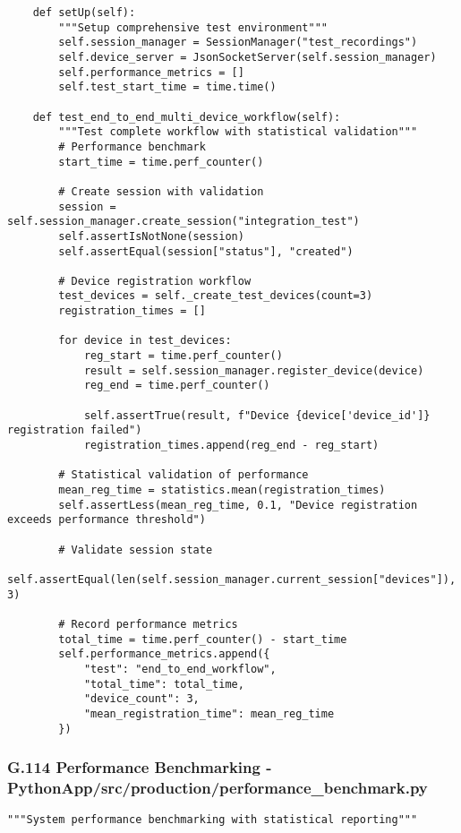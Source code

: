 \documentclass[12pt,a4paper]{article}
\begin{document}
{{\begin{verbatim}
    def setUp(self):
        """Setup comprehensive test environment"""
        self.session_manager = SessionManager("test_recordings")
        self.device_server = JsonSocketServer(self.session_manager)
        self.performance_metrics = []
        self.test_start_time = time.time()
        
    def test_end_to_end_multi_device_workflow(self):
        """Test complete workflow with statistical validation"""
        # Performance benchmark
        start_time = time.perf_counter()
        
        # Create session with validation
        session = self.session_manager.create_session("integration_test")
        self.assertIsNotNone(session)
        self.assertEqual(session["status"], "created")
        
        # Device registration workflow
        test_devices = self._create_test_devices(count=3)
        registration_times = []
        
        for device in test_devices:
            reg_start = time.perf_counter()
            result = self.session_manager.register_device(device)
            reg_end = time.perf_counter()
            
            self.assertTrue(result, f"Device {device['device_id']} registration failed")
            registration_times.append(reg_end - reg_start)
        
        # Statistical validation of performance
        mean_reg_time = statistics.mean(registration_times)
        self.assertLess(mean_reg_time, 0.1, "Device registration exceeds performance threshold")
        
        # Validate session state
        self.assertEqual(len(self.session_manager.current_session["devices"]), 3)
        
        # Record performance metrics
        total_time = time.perf_counter() - start_time
        self.performance_metrics.append({
            "test": "end_to_end_workflow",
            "total_time": total_time,
            "device_count": 3,
            "mean_registration_time": mean_reg_time
        })
\end{verbatim}

\subsubsection{G.114 Performance Benchmarking - PythonApp/src/production/performance_benchmark.py}

\begin{verbatim}
"""System performance benchmarking with statistical reporting"""


\end{verbatim}}}
\end{document}
